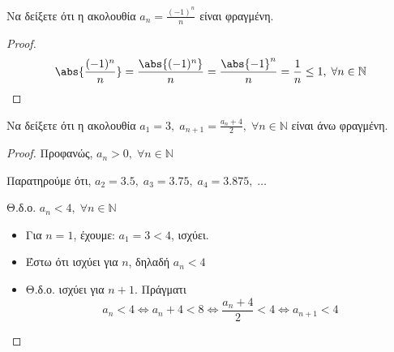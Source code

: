 \begin{enumerate}



  \item Να δείξετε ότι η ακολουθία $ a_{n} = \frac{(-1)^{n}}{n} $ είναι 
    φραγμένη.
    \begin{proof}
      \[
        \abs{\frac{(-1)^{n}}{n}} = \frac{\abs{(-1)^{n}}}{n} = 
        \frac{\abs{-1}^{n}}{n} = \frac{1}{n} \leq 1, \; \forall n \in 
        \mathbb{N} 
      \] 
    \end{proof}



  \item Να δείξετε ότι η ακολουθία $ a_{1} = 3, \; a_{n+1} =
    \frac{a_{n}+4}{2}, \; \forall n \in \mathbb{N} $ είναι άνω φραγμένη.
    \begin{proof}
    \item {}
      Προφανώς, $ a_{n} > 0, \; \forall n \in \mathbb{N} $ 

      Παρατηρούμε ότι, $ a_{2}=3.5, \; a_{3}=3.75, \; a_{4}=3.875, \; 
      \ldots $

      Θ.δ.ο. $ a_{n} < 4, \; \forall n \in \mathbb{N} $ 
      \begin{itemize}
        \item Για $ n=1 $, έχουμε: $ a_{1}=3 < 4 $, ισχύει.
        \item Έστω ότι ισχύει για $n$, δηλαδή $ a_{n} < 4 $
        \item Θ.δ.ο. ισχύει για $ n+1 $. Πράγματι
          \[
            a_{n}<4 \Leftrightarrow a_{n}+4 < 8 \Leftrightarrow 
            \frac{a_{n}+4}{2} < 4 \Leftrightarrow a_{n+1} <4
          \] 
      \end{itemize}
    \end{proof}


\end{enumerate}
